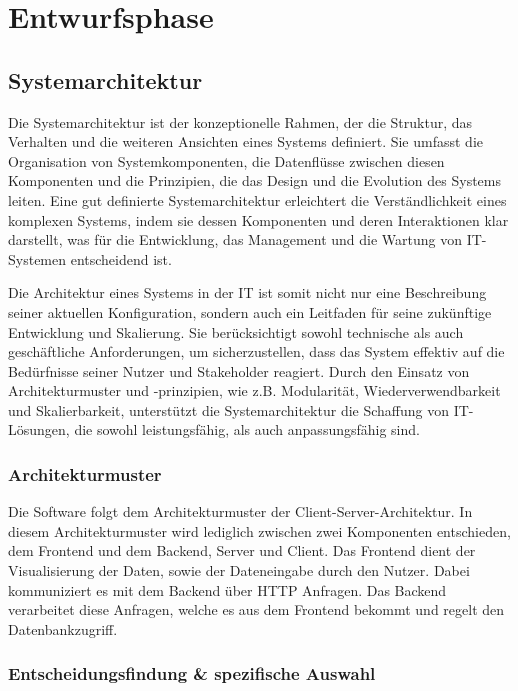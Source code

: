 \section{Entwurfsphase}

\subsection{Systemarchitektur}

Die Systemarchitektur ist der konzeptionelle Rahmen, der die Struktur, das Verhalten und die weiteren Ansichten eines Systems definiert.
Sie umfasst die Organisation von Systemkomponenten, die Datenflüsse zwischen diesen Komponenten und die Prinzipien, die das Design und
die Evolution des Systems leiten. Eine gut definierte Systemarchitektur erleichtert die Verständlichkeit eines komplexen Systems, indem
sie dessen Komponenten und deren Interaktionen klar darstellt, was für die Entwicklung, das Management und die Wartung von IT-Systemen
entscheidend ist.

Die Architektur eines Systems in der IT ist somit nicht nur eine Beschreibung seiner aktuellen Konfiguration, sondern auch ein Leitfaden für
seine zukünftige Entwicklung und Skalierung. Sie berücksichtigt sowohl technische als auch geschäftliche Anforderungen, um sicherzustellen,
dass das System effektiv auf die Bedürfnisse seiner Nutzer und Stakeholder reagiert. Durch den Einsatz von Architekturmuster und -prinzipien,
wie z.B. Modularität, Wiederverwendbarkeit und Skalierbarkeit, unterstützt die Systemarchitektur die Schaffung von IT-Lösungen, die sowohl
leistungsfähig, als auch anpassungsfähig sind.

\subsubsection{Architekturmuster}

Die Software folgt dem Architekturmuster der Client-Server-Architektur. In diesem Architekturmuster wird lediglich zwischen zwei Komponenten
entschieden, dem Frontend und dem Backend, Server und Client. Das Frontend dient der Visualisierung der Daten, sowie der Dateneingabe durch den
Nutzer. Dabei kommuniziert es mit dem Backend über HTTP Anfragen. Das Backend verarbeitet diese Anfragen, welche es aus dem Frontend bekommt
und regelt den Datenbankzugriff.

\subsubsection{Entscheidungsfindung \& spezifische Auswahl}

